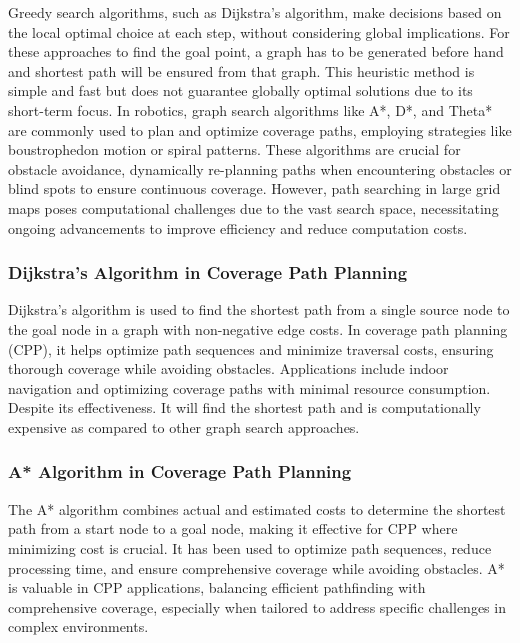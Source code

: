 Greedy search algorithms, such as Dijkstra's algorithm, make decisions based on the local optimal choice at each step, without considering global implications. For these approaches to find the goal point, a graph has to be generated before hand and shortest path will be ensured from that graph. This heuristic method is simple and fast but does not guarantee globally optimal solutions due to its short-term focus. In robotics, graph search algorithms like A*, D*, and Theta* are commonly used to plan and optimize coverage paths, employing strategies like boustrophedon motion or spiral patterns. These algorithms are crucial for obstacle avoidance, dynamically re-planning paths when encountering obstacles or blind spots to ensure continuous coverage. However, path searching in large grid maps poses computational challenges due to the vast search space, necessitating ongoing advancements to improve efficiency and reduce computation costs.


\subsubsection{Dijkstra's Algorithm in Coverage Path Planning}  

Dijkstra's algorithm is used to find the shortest path from a single source node to the goal node in a graph with non-negative edge costs. In coverage path planning (CPP), it helps optimize path sequences and minimize traversal costs, ensuring thorough coverage while avoiding obstacles. Applications include indoor navigation and optimizing coverage paths with minimal resource consumption. Despite its effectiveness. It will find the shortest path and is computationally expensive as compared to other graph search approaches.


\subsubsection{A* Algorithm in Coverage Path Planning}

The A* algorithm combines actual and estimated costs to determine the shortest path from a start node to a goal node, making it effective for CPP where minimizing cost is crucial. It has been used to optimize path sequences, reduce processing time, and ensure comprehensive coverage while avoiding obstacles. A* is valuable in CPP applications, balancing efficient pathfinding with comprehensive coverage, especially when tailored to address specific challenges in complex environments.


